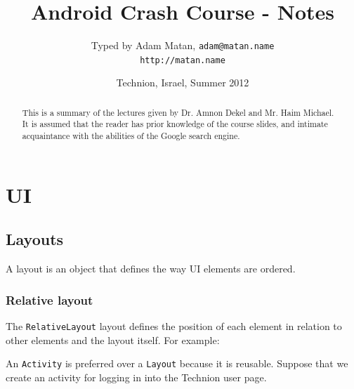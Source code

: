 \documentclass{article}
\begin{document}
\def\codefont{
\fontspec{Courier New}
  \fontsize{9pt}{11pt}\selectfont}
\newenvironment{code}
{\begin{center}
    \begin{tikzpicture}
      \node [fill=codebgcolor,rounded corners=5pt]
      \bgroup
      \bgroup\codefont
      \begin{tabular}{l}}
      {\end{tabular}
      \egroup
      \egroup;
    \end{tikzpicture}
  \end{center}}


\title{Android Crash Course - Notes}
\author{Typed by Adam Matan, \texttt{adam@matan.name} \\
\texttt{http://matan.name}}
\date{Technion, Israel, Summer 2012}

\maketitle

\begin{abstract}
This is a summary of the lectures given by Dr. Amnon Dekel and Mr. Haim Michael. It is assumed that the reader has prior knowledge of the course slides, and intimate acquaintance with the abilities of the Google search engine.
\end{abstract}

\tableofcontents

\section{UI}
\subsection{Layouts}
A layout is an object that defines the way UI elements are ordered.

\subsubsection{Relative layout}

The \texttt{RelativeLayout} layout defines the position of each element in relation to other elements and the layout itself. For example:

An \texttt{Activity} is preferred over a \texttt{Layout} because it is reusable. Suppose that we create an activity for logging in into the Technion user page. 
\end{document}
